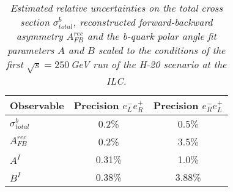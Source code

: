         \begin{table}
        \begin{center}
        \begin{tabular}{l c c}
        \hline
	Observable & Precision $e^-_Le^+_R$ & Precision $e^-_Re^+_L$\\
	\hline
	$\sigma^b_{total} $  & 0.2\%   & 0.5\% \\
	$A_{FB}^{rec} $& 0.2\%  & 3.5\% \\
	$A^I $ 			& 0.31\% & 1.0\% \\
	$B^I $ 			& 0.38\% & 3.88\% \\
		
        \hline
        \end{tabular}
        \end{center}
        \caption{\sl Estimated relative uncertainties on the total cross section $\sigma^b_{total}$, reconstructed forward-backward asymmetry $A_{FB}^{rec}$ and the b-quark polar angle fit parameters $A$ and $B$ scaled to the conditions of the first $\sqrt{s}=250$\,GeV run of the H-20 scenario at the ILC. }
        \label{table:bbbarfinal}
        \end{table}
